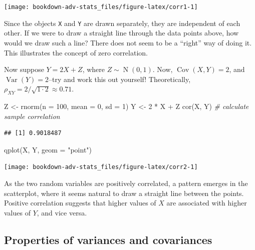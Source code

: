 \documentclass[
]{book}
\newenvironment{Shaded}{\begin{snugshade}}{\end{snugshade}}
\newcommand{\AttributeTok}[1]{\textcolor[rgb]{0.77,0.63,0.00}{#1}}
\newcommand{\CommentTok}[1]{\textcolor[rgb]{0.56,0.35,0.01}{\textit{#1}}}
\newcommand{\DecValTok}[1]{\textcolor[rgb]{0.00,0.00,0.81}{#1}}
\newcommand{\FunctionTok}[1]{\textcolor[rgb]{0.00,0.00,0.00}{#1}}
\newcommand{\NormalTok}[1]{#1}
\newcommand{\OtherTok}[1]{\textcolor[rgb]{0.56,0.35,0.01}{#1}}
\newcommand{\SpecialCharTok}[1]{\textcolor[rgb]{0.00,0.00,0.00}{#1}}
\newcommand{\StringTok}[1]{\textcolor[rgb]{0.31,0.60,0.02}{#1}}
\DeclareMathOperator{\Var}{Var}
\DeclareMathOperator{\Cov}{Cov}
\DeclareMathOperator{\N}{N}
\theoremstyle{definition}
\theoremstyle{definition}
\theoremstyle{definition}
\theoremstyle{definition}
\theoremstyle{remark}
\begin{document}
\begin{center}\texttt{[image: bookdown-adv-stats\_files/figure-latex/corr1-1]} \end{center}

Since the objects \texttt{X} and \texttt{Y} are drawn separately, they are independent of each other.
If we were to draw a straight line through the data points above, how would we draw such a line?
There does not seem to be a ``right'' way of doing it.
This illustrates the concept of zero correlation.

Now suppose \(Y=2X + Z\), where \(Z\sim\N(0,1)\).
Now, \(\Cov(X,Y)= 2\), and \(\Var(Y)=2\)--try and work this out yourself!
Theoretically, \(\rho_{XY}=2/\sqrt{1\cdot 2}\approx 0.71\).

\begin{Shaded}
\begin{Highlighting}[]
\NormalTok{Z }\OtherTok{\textless{}{-}} \FunctionTok{rnorm}\NormalTok{(}\AttributeTok{n =} \DecValTok{100}\NormalTok{, }\AttributeTok{mean =} \DecValTok{0}\NormalTok{, }\AttributeTok{sd =} \DecValTok{1}\NormalTok{)}
\NormalTok{Y }\OtherTok{\textless{}{-}} \DecValTok{2} \SpecialCharTok{*}\NormalTok{ X }\SpecialCharTok{+}\NormalTok{ Z}
\FunctionTok{cor}\NormalTok{(X, Y)  }\CommentTok{\# calculate sample correlation}
\end{Highlighting}
\end{Shaded}

\begin{verbatim}
## [1] 0.9018487
\end{verbatim}

\begin{Shaded}
\begin{Highlighting}[]
\FunctionTok{qplot}\NormalTok{(X, Y, }\AttributeTok{geom =} \StringTok{"point"}\NormalTok{)}
\end{Highlighting}
\end{Shaded}

\begin{center}\texttt{[image: bookdown-adv-stats\_files/figure-latex/corr2-1]} \end{center}

As the two random variables are positively correlated, a pattern emerges in the scatterplot, where it seems natural to draw a straight line between the points.
Positive correlation suggests that higher values of \(X\) are associated with higher values of \(Y\), and vice versa.

\hypertarget{properties-of-variances-and-covariances}{%
\subsection{Properties of variances and covariances}\label{properties-of-variances-and-covariances}}
\end{document}

